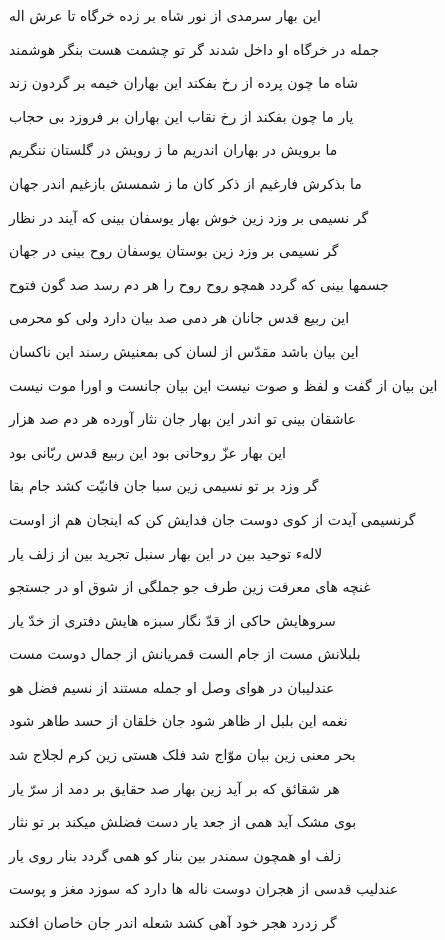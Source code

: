 اين بهار سرمدى از نور شاه
بر زده خرگاه تا عرش اله

جمله در خرگاه او داخل شدند
گر تو چشمت هست بنگر هوشمند

شاه ما چون پرده از رخ بفکند
اين بهاران خيمه بر گردون زند

يار ما چون بفکند از رخ نقاب
اين بهاران بر فروزد بى حجاب

ما برويش در بهاران اندريم
ما ز رويش در گلستان ننگريم

ما بذکرش فارغيم از ذکر کان
ما ز شمسش بازغيم اندر جهان

گر نسيمى بر وزد زين خوش بهار
يوسفان بينى که آيند در نظار

گر نسيمى بر وزد زين بوستان
يوسفان روح بينى در جهان

جسمها بينى که گردد همچو روح
روح را هر دم رسد صد گون فتوح

اين ربيع قدس جانان هر دمى
صد بيان دارد ولی کو محرمى

اين بيان باشد مقدّس از لسان
کى بمعنيش رسند اين ناکسان

اين بيان از گفت و لفظ و صوت نيست
اين بيان جانست و اورا موت نيست

عاشقان بينى تو اندر اين بهار
جان نثار آورده هر دم صد هزار

اين بهار عزّ روحانى بود
اين ربيع قدس ربّانى بود

گر وزد بر تو نسيمى زين سبا
جان فانيّت کشد جام بقا

گرنسيمى آيدت از کوى دوست
جان فدايش کن که اينجان هم از اوست

لالهء توحيد بين در اين بهار
سنبل تجريد بين از زلف يار

غنچه هاى معرفت زين طرف جو
جملگى از شوق او در جستجو

سروهايش حاکى از قدّ نگار
سبزه هايش دفترى از خدّ يار

بلبلانش مست از جام الست
قمريانش از جمال دوست مست

عندليبان در هواى وصل او
جمله مستند از نسيم فضل هو

نغمه اين بلبل ار ظاهر شود
جان خلقان از حسد طاهر شود

بحر معنى زين بيان موّاج شد
فلک هستى زين کرم لجلاج شد

هر شقائق که بر آيد زين بهار
صد حقايق بر دمد از سرّ يار

بوى مشک آيد همى از جعد يار
دست فضلش ميکند بر تو نثار

زلف او همچون سمندر بين بنار
کو همى گردد بنار روى يار

عندليب قدسى از هجران دوست
ناله ها دارد که سوزد مغز و پوست

گر زدرد هجر خود آهى کشد
شعله اندر جان خاصان افکند

